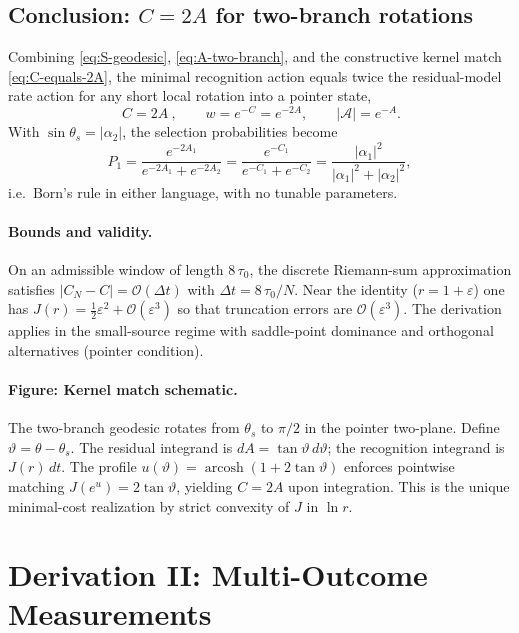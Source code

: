 \documentclass[11pt,letterpaper]{article}
\theoremstyle{definition}
\begin{document}
\subsection{Conclusion: \(C=2A\) for two-branch rotations}

Combining \eqref{eq:S-geodesic}, \eqref{eq:A-two-branch}, and the constructive kernel match \eqref{eq:C-equals-2A}, the minimal recognition action equals twice the residual-model rate action for any short local rotation into a pointer state,
\begin{equation}
\boxed{~C=2A~},
\qquad
w=e^{-C}=e^{-2A},
\qquad
|\mathcal A|=e^{-A}.
\label{eq:two-branch-bridge}
\end{equation}
With \(\sin\theta_s=|\alpha_2|\), the selection probabilities become
\begin{equation}
P_1=\frac{e^{-2A_1}}{e^{-2A_1}+e^{-2A_2}}
=\frac{e^{-C_1}}{e^{-C_1}+e^{-C_2}}
=\frac{|\alpha_1|^2}{|\alpha_1|^2+|\alpha_2|^2},
\end{equation}
i.e.\ Born's rule in either language, with no tunable parameters.
\paragraph{Bounds and validity.}
On an admissible window of length $8\,\tau_0$, the discrete Riemann-sum approximation satisfies $|C_N-C|=\mathcal O(\Delta t)$ with $\Delta t=8\,\tau_0/N$. Near the identity ($r=1+\varepsilon$) one has $J(r)=\tfrac12\varepsilon^2+\mathcal O(\varepsilon^3)$ so that truncation errors are $\mathcal O(\varepsilon^3)$. The derivation applies in the small-source regime with saddle-point dominance and orthogonal alternatives (pointer condition).

\paragraph{Figure: Kernel match schematic.}
The two-branch geodesic rotates from $\theta_s$ to $\pi/2$ in the pointer two-plane. Define $\vartheta=\theta-\theta_s$. The residual integrand is $dA=\tan\vartheta\,d\vartheta$; the recognition integrand is $J(r)\,dt$. The profile $u(\vartheta)=\operatorname{arcosh}(1+2\tan\vartheta)$ enforces pointwise matching $J(e^u)=2\tan\vartheta$, yielding $C=2A$ upon integration. This is the unique minimal-cost realization by strict convexity of $J$ in $\ln r$.

\section{Derivation II: Multi-Outcome Measurements}
\label{sec:deriv-ii}
\end{document}
